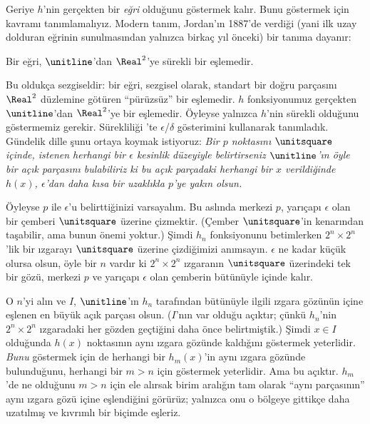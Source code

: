 \documentclass[../../../include/open-logic-section]{subfiles}
\begin{document}
Geriye $h$'nin gerçekten bir \emph{eğri} olduğunu göstermek kalır. Bunu
göstermek için kavramı tanımlamalıyız. Modern tanım, Jordan'ın 1887'de verdiği
(yani ilk uzay dolduran eğrinin sunulmasından yalnızca birkaç yıl önceki) bir
tanıma dayanır:

\begin{defn}
Bir eğri, $\unitline$'dan $\Real^2$'ye sürekli bir eşlemedir.
\end{defn}

Bu oldukça sezgiseldir: bir eğri, sezgisel olarak, standart bir doğru
parçasını $\Real^2$ düzlemine götüren ``pürüzsüz'' bir eşlemedir. $h$
fonksiyonumuz gerçekten $\unitline$'dan $\Real^2$'ye bir eşlemedir. Öyleyse
yalnızca $h$'nin sürekli olduğunu göstermemiz gerekir. Sürekliliği
'te $\epsilon$/$\delta$ gösterimini kullanarak tanımladık.
Gündelik dille şunu ortaya koymak istiyoruz: \emph{Bir $p$ noktasını
$\unitsquare$ içinde, istenen herhangi bir $\epsilon$ kesinlik düzeyiyle
belirtirseniz $\unitline$'ın öyle bir açık parçasını bulabiliriz ki bu açık
parçadaki herhangi bir $x$ verildiğinde $h(x)$, $\epsilon$'dan daha kısa bir
uzaklıkla $p$'ye yakın olsun.
}

Öyleyse $p$ ile $\epsilon$'u belirttiğinizi varsayalım. Bu aslında merkezi
$p$, yarıçapı $\epsilon$ olan bir çemberi $\unitsquare$ üzerine çizmektir.
(Çember $\unitsquare$'in kenarından taşabilir, ama bunun önemi yoktur.) Şimdi
$h_n$ fonksiyonunu betimlerken $2^n \times 2^n$'lik bir ızgarayı
$\unitsquare$ üzerine çizdiğimizi anımsayın. $\epsilon$ ne kadar küçük olursa
olsun, öyle bir $n$ vardır ki $2^n \times 2^n$ ızgaranın $\unitsquare$
üzerindeki tek bir gözü, merkezi $p$ ve yarıçapı $\epsilon$ olan çemberin
bütünüyle içinde kalır.

O $n$'yi alın ve $I$, $\unitline$'ın $h_n$ tarafından bütünüyle ilgili ızgara
gözünün içine eşlenen en büyük açık parçası olsun. ($I$'nın var olduğu
açıktır; çünkü $h_n$'nin $2^n\times 2^n$ ızgaradaki her gözden geçtiğini daha
önce belirtmiştik.) Şimdi $x \in I$ olduğunda $h(x)$ noktasının aynı ızgara
gözünde kaldığını göstermek yeterlidir. \emph{Bunu} göstermek için de herhangi bir
$h_m(x)$'in aynı ızgara gözünde bulunduğunu, herhangi bir $m > n$ için
göstermek yeterlidir. Ama bu açıktır. $h_m$'de ne olduğunu $m > n$ için ele
alırsak birim aralığın
tam olarak ``aynı parçasının'' aynı ızgara gözü içine eşlendiğini görürüz;
yalnızca onu o bölgeye gittikçe daha uzatılmış ve kıvrımlı bir biçimde
eşleriz.
\end{document}
